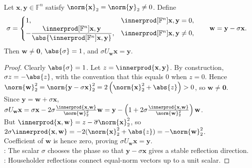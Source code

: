 \begin{theorem} \label{thm:householder-maps-equal-norm-vectors} \\
Let $\mathbf{x},\mathbf{y}\in\mathbb{F}^n$ satisfy $\norm{\mathbf{x}}_2=\norm{\mathbf{y}}_2\neq0$. Define
\begin{align}
\sigma=
\begin{cases}
1, & \innerprod[\mathbb{F}^n]{\mathbf{x},\mathbf{y}}=0,\\
-\dfrac{\innerprod[\mathbb{F}^n]{\mathbf{x},\mathbf{y}}}{\abs{\innerprod[\mathbb{F}^n]{\mathbf{x},\mathbf{y}}}}, & \innerprod[\mathbb{F}^n]{\mathbf{x},\mathbf{y}}\neq0,
\end{cases}
\qquad
\mathbf{w}=\mathbf{y}-\sigma\mathbf{x}.
\nonumber
\end{align}
Then $\mathbf{w}\neq\mathbf{0}$, $\abs{\sigma}=1$, and $\sigma U_{\mathbf{w}}\mathbf{x}=\mathbf{y}$.
\begin{proof}
Clearly $\abs{\sigma}=1$. Let $z=\innerprod{\mathbf{x},\mathbf{y}}$. By construction, $\sigma z=-\abs{z}$, with the convention that this equals $0$ when $z=0$. Hence $\norm{\mathbf{w}}_2^2 =\norm{\mathbf{y}-\sigma\mathbf{x}}_2^2 =2\left(\norm{\mathbf{x}}_2^2+\abs{z}\right)>0$, so $\mathbf{w}\neq\mathbf{0}$.\\
Since $\mathbf{y}=\mathbf{w}+\sigma\mathbf{x}$, $\sigma U_{\mathbf{w}}\mathbf{x} =\sigma\mathbf{x}-2\sigma\frac{\innerprod{\mathbf{x},\mathbf{w}}}{\norm{\mathbf{w}}_2^2}\mathbf{w} =\mathbf{y}-\left(1+2\sigma\frac{\innerprod{\mathbf{x},\mathbf{w}}}{\norm{\mathbf{w}}_2^2}\right)\mathbf{w}$.\\
But $\innerprod{\mathbf{x},\mathbf{w}}=z-\overline{\sigma}\norm{\mathbf{x}}_2^2$, so $2\sigma\innerprod{\mathbf{x},\mathbf{w}}=-2(\norm{\mathbf{x}}_2^2+\abs{z})=-\norm{\mathbf{w}}_2^2$.\\
Coefficient of $\mathbf{w}$ is hence zero, proving $\sigma U_{\mathbf{w}}\mathbf{x}=\mathbf{y}$.\\
: The scalar $\sigma$ chooses the phase so that $\mathbf{y}-\sigma\mathbf{x}$ gives a stable reflection direction.\\
: Householder reflections connect equal-norm vectors up to a unit scalar.
\end{proof}
\end{theorem}

